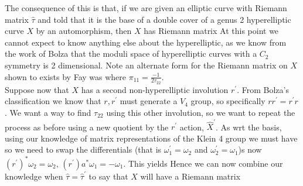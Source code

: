 \documentclass{article}
\begin{document}
The consequence of this is that, if we are given an elliptic curve with Riemann matrix $\hat{\tau}$ and told that it is the base of a double cover of a genus 2 hyperelliptic curve $X$ by an automorphism, then $X$ has Riemann matrix 
At this point we cannot expect to know anything else about the hyperelliptic, as we know from the work of Bolza that the moduli space of hyperelliptic curves with a $C_2$ symmetry is 2 dimensional. Note an alternate form for the Riemann matrix on $X$ shown to exists by Fay was 
where $\pi_{11} = \frac{-1}{2\tau_{22}}$. \\
Suppose now that $X$ has a second non-hyperelliptic involution $r^\prime$. From Bolza's classification we know that $r,r^\prime$ must generate a $V_4$ group, so specifically $rr^\prime = r^\prime r$. We want a way to find $\tau_{22}$ using this other involution, so we want to repeat the process as before using  a new quotient by the $r^\prime$ action, $\hat{X}^\prime$. As 
wrt the basis, using our knowledge of matrix representations of the Klein 4 group we must have 
so we need to swap the differentials (that is $\omega_1^\prime = \omega_2$ and $\omega_2^\prime = \omega_1$)s now $(r^\prime)^\ast \omega_2 = \omega_2, \, (r^\prime) a^\ast \omega_1 = -\omega_1$. This yields 
Hence we can now combine our knowledge when $\hat{\tau} = \hat{\tau}^\prime$ to say that $X$ will have a Riemann matrix
\end{document}
